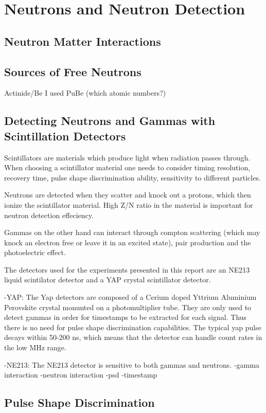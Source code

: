 \documentclass[main.tex]{subfiles}
\begin{document}
\section{Neutrons and Neutron Detection}

\subsection{Neutron Matter Interactions}

\subsection{Sources of Free Neutrons}
Actinide/Be
I used PuBe (which atomic numbers?)

\subsection{Detecting Neutrons and Gammas with Scintillation Detectors}
Scintillators are materials which produce light when radiation passes through. When choosing a scintillator material one needs to consider timing resolution, recovery time, pulse shape discrimination ability, sensitivity to different particles.

Neutrons are detected when they scatter and knock out a protons, which then ionize the scintillator material. High Z/N ratio in the material is important for neutron detection effeciency.

Gammas on the other hand can interact through compton scattering (which may knock an electron free or leave it in an excited state), pair production and the photoelectric effect.

The detectors used for the experiments presented in this report are an NE213 liquid scintilator detector and a YAP crystal scintillator detector.

-YAP: The Yap detectors are composed of a Cerium doped Yttrium Aluminium Perovskite crystal monunted on a photomultiplier tube.
They are only used to detect gammas in order for timestamps to be extracted for each signal. Thus there is no need for pulse shape discrimination capabilities. The typical yap pulse decays within 50-200 ns, which means that the detector can handle count rates in the low MHz range.

-NE213: The NE213 detector is sensitive to both gammas and neutrons. 
-gamma interaction
-neutron interaction
-psd
-timestamp

\subsection{Pulse Shape Discrimination}
\end{document}
